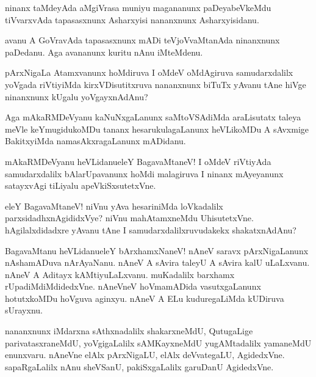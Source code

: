 \begin{mng}
ninanx taMdeyAda aMgiVrasa muniyu magananunx paDeyabeVkeMdu tiVvarxvAda tapasasxnunx Asharxyisi nananxnunx  Asharxyisidanu.
\end{mng}

\begin{mng}
avanu A GoVravAda tapasasxnunx mADi teVjoVvaMtanAda ninanxnunx paDedanu. Aga avananunx kuritu nAnu iMteMdenu.
\end{mng}

\begin{mng}
pArxNigaLa Atamxvanunx hoMdiruva I oMdeV oMdAgiruva samudarxdalilx yoVgada riVtiyiMda kirxVDisutitxruva nananxnunx biTuTx yAvanu tAne hiVge ninanxnunx kUgalu yoVgayxnAdAnu?
\end{mng}

\begin{mng}
Aga mAkaRMDeVyanu kaNuNxgaLanunx saMtoVSAdiMda araLisutatx taleya meVle keYmugidukoMDu tananx hesarukulagaLanunx heVLikoMDu A sAvxmige BakitxyiMda namasAkxragaLanunx mADidanu.
\end{mng}

\begin{mng}
mAkaRMDeVyanu heVLidanu\mdash eleY BagavaMtaneV! I oMdeV riVtiyAda samudarxdalilx bAlarUpavanunx hoMdi malagiruva I ninanx mAyeyanunx satayxvAgi tiLiyalu apeVkiSxsutetxVne.
\end{mng}

\begin{mng}
eleY BagavaMtaneV! niVnu yAva hesariniMda loVkadalilx parxsidadhxnAgididxVye? niVnu mahAtamxneMdu UhisutetxVne. hAgilalxdidadxre yAvanu tAne I samudarxdalilxruvudakekx shakatxnAdAnu?
\end{mng}

\begin{mng}
BagavaMtanu heVLidanu\mdash eleY bArxhamxNaneV! nAneV saravx pArxNigaLanunx nAshamADuva nArAyaNanu. nAneV A sAvira taleyU A sAvira kalU uLaLxvanu. nAneV A Aditayx kAMtiyuLaLxvanu. muKadalilx barxhamx rUpadiMdiMdidedxVne. nAneVneV hoVmamADida vasutxgaLanunx hotutxkoMDu hoVguva aginxyu. nAneV A ELu kuduregaLiMda kUDiruva sUrayxnu.
\end{mng}

\begin{mng}
nananxnunx iMdarxna sAthxnadalilx shakarxneMdU, QutugaLige parivatasxraneMdU, yoVgigaLalilx sAMKayxneMdU yugAMtadalilx yamaneMdU enunxvaru. nAneVne elAlx pArxNigaLU, elAlx deVvategaLU, AgidedxVne. sapaRgaLalilx nAnu sheVSanU, pakiSxgaLalilx garuDanU AgidedxVne.
\end{mng}

